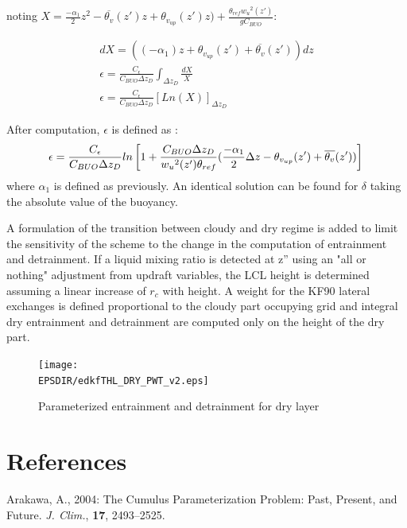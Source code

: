 noting $X=\frac{- \alpha_1}{2}z^2 - \overline{\theta_v}(z')z + \theta_{v_{up}}(z')z) + \frac{\theta_{ref}{w_u}^2(z')}{gC_{BUO}}$:

\begin{eqnarray}
   dX= ((- \alpha_1) z + \theta_{v_{up}}(z') +  \overline{\theta_v}(z'))dz\\
   \epsilon = \frac{C_{\epsilon}}{C_{BUO}\Delta z_D}\int_{\Delta z_D} \frac{dX}{X}\\
   \epsilon = \frac{C_{\epsilon}}{C_{BUO}\Delta z_D}[Ln(X)]_{\Delta z_D}
   \label{eq:primitive6}
\end{eqnarray}

After computation, $\epsilon$ is defined as :
\begin{equation}
   \epsilon=\frac{C_{\epsilon}}{C_{BUO}\Delta z_D} ln\left[ 1+\frac{C_{BUO}\Delta z_D}{{w_u}^2(z')\theta_{ref}} (\frac{- \alpha_1}{2} \Delta z - \theta_{v_{up}}(z') +  \overline{\theta_v}(z'))\right]\\
   \label{eq:epsilon}
\end{equation}
where $\alpha_1$ is defined as previously. An identical solution can be found for $\delta$ taking the absolute value of the buoyancy.

A formulation of the transition between cloudy and dry regime is added to limit the sensitivity of the scheme to the change in the computation of entrainment and detrainment. If a liquid mixing ratio is detected at z'' using an "all or nothing" adjustment from updraft variables, the LCL height is determined assuming a linear increase of $r_c$ with height. A weight for the KF90 lateral exchanges is defined proportional to the cloudy part occupying grid and integral dry entrainment and detrainment are computed only on the height of the dry part.

\begin{figure}
  \begin{center}
    \texttt{[image: \\EPSDIR/edkfTHL\_DRY\_PWT\_v2.eps]}
  \end{center}
  \caption{Parameterized entrainment and detrainment for dry layer}
  \label{fig:SchemeDes2}
\end{figure}

\section{References}

\noindent \por
Arakawa, A., 2004: 
The Cumulus Parameterization Problem: Past, Present, and Future.
{\it J. Clim.}, {\bf 17}, 2493--2525.

